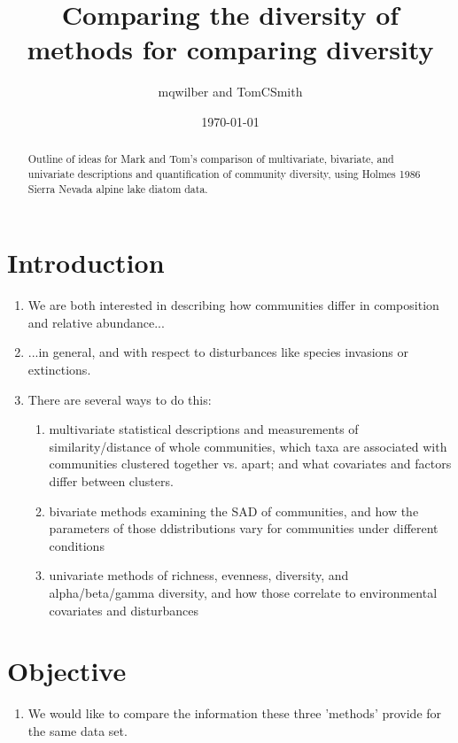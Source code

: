 \documentclass[a4paper]{article}
\title{Comparing the diversity of methods for comparing diversity}
\author{mqwilber and TomCSmith}
\date{\today}
\begin{document}
\maketitle

\begin{abstract}

Outline of ideas for Mark and Tom's comparison of multivariate, bivariate, and univariate descriptions and quantification of community diversity, using Holmes 1986 Sierra Nevada alpine lake diatom data.
\end{abstract}


\section{Introduction}

\begin{enumerate}

    \item We are both interested in describing how communities differ in composition and relative abundance...

    \item ...in general, and with respect to disturbances like species invasions or extinctions.

    \item There are several ways to do this:

     \begin{enumerate}
         \item multivariate statistical descriptions and measurements of similarity/distance of whole communities, which taxa are associated with communities clustered together vs. apart; and what covariates and factors differ between clusters.
         \item bivariate methods examining the SAD of communities, and how the parameters of those ddistributions vary for communities under different conditions
         \item univariate methods of richness, evenness, diversity, and alpha/beta/gamma diversity, and how those correlate to environmental covariates and disturbances
     \end{enumerate}
\end{enumerate}

\section{Objective}
\begin{enumerate}
\item We would like to compare the information these three 'methods' provide for the same data set.
\end{enumerate}
\end{document}
